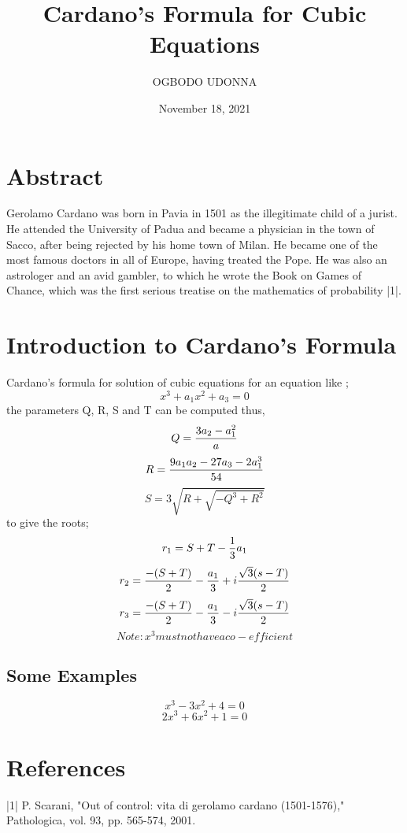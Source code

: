 \documentclass{article}
\title{Cardano's Formula for Cubic Equations}
\author{OGBODO UDONNA}
\date{November 18, 2021}
\begin{document}
	\maketitle
	 \section*{Abstract}Gerolamo Cardano was born in Pavia in 1501 as the illegitimate child of a jurist. He attended the University of Padua and became a physician in the town of Sacco, after being rejected by his home town of Milan. He became one of the most famous doctors in all of Europe, having treated the Pope. He was also an astrologer and an avid gambler, to which he wrote the Book on Games of Chance, which was the first serious treatise on the mathematics of probability |1|.
	\section{Introduction to Cardano's Formula} Cardano's formula for solution of cubic equations for an equation like ;
	\begin{equation*}
		x^3 + a_1x^2 + a_3 = 0
	\end{equation*}
the parameters Q, R, S and T can be computed thus,
\begin{equation*}
	Q= \frac{3a_2-a_1^2}{a}\\
\end{equation*}
	\begin{equation*}
	R=\frac{9a_1a_2-27a_3-2a_1^3}{54}\\
\end{equation*}
	\begin{equation*}
	S=3\sqrt{R+\sqrt{-Q^3+R^2}}
\end{equation*}
to give the roots;
\begin{equation*}
	r_1= S+T -\frac{1}{3}a_1\\
\end{equation*}
\begin{equation*}
	r_2= \frac{-(S+T)}{2}-\frac{a_1}{3}+i\frac{\sqrt{3}(s-T)}{2}\\
\end{equation*}
	\begin{equation*}
	r_3= \frac{-(S+T)}{2}-\frac{a_1}{3}-i\frac{\sqrt{3}(s-T)}{2}\\
\end{equation*}
\begin{equation*}
		Note: x^3 must not have a co-efficient
\end{equation*}
\subsection{Some Examples}
	\begin{equation*}
		 x^3-3x^2+4=0
	\end{equation*}
\begin{equation*}
		2x^3+6x^2+1=0
	\end{equation*}

\section*{References} |1| P. Scarani, "Out of control: vita di gerolamo cardano (1501-1576)," Pathologica, vol. 93, pp. 565-574, 2001.
\end{document}
